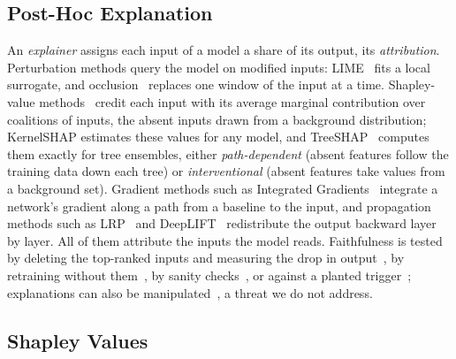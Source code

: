 \subsection{Post-Hoc Explanation}
\label{sec:XML:BgExplanation}

An \emph{explainer} assigns each input of a model a share of its output, its \emph{attribution}. Perturbation methods
query the model on modified inputs: LIME~\cite{ribeiro2016should} fits a local surrogate, and
occlusion~\cite{zeiler2014visualizing} replaces one window of the input at a time. Shapley-value
methods~\cite{vstrumbelj2014explaining, lundberg2017unified} credit each input with its average marginal contribution
over coalitions of inputs, the absent inputs drawn from a background distribution; KernelSHAP estimates these values
for any model, and TreeSHAP~\cite{lundberg2020local} computes them exactly for tree ensembles, either
\emph{path-dependent} (absent features follow the training data down each tree) or \emph{interventional} (absent
features take values from a background set). Gradient methods such as Integrated
Gradients~\cite{sundararajan2017axiomatic} integrate a network's gradient along a path from a baseline to the input,
and propagation methods such as LRP~\cite{bach2015pixel} and DeepLIFT~\cite{shrikumar2017learning} redistribute the
output backward layer by layer. All of them attribute the inputs the model reads. Faithfulness is tested by deleting
the top-ranked inputs and measuring the drop in output~\cite{petsiuk2018rise}, by retraining without
them~\cite{hooker2019benchmark}, by sanity checks~\cite{adebayo2018sanity}, or against a planted
trigger~\cite{lin2021what}; explanations can also be manipulated~\cite{slack2020fooling}, a threat we do not address.

\subsection{Shapley Values}
\label{sec:XML:BgShapley}

